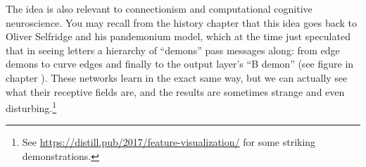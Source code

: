 The idea is also relevant to connectionism and computational cognitive neuroscience. You may recall from the history chapter that this idea goes  back to Oliver Selfridge and his pandemonium model, which at the time just speculated that in seeing letters a hierarchy of ``demons'' pass messages along: from edge demons to curve edges and finally to the output layer's ``B demon'' (see figure  in chapter ). These networks learn in the exact same way, but we can actually  see what their receptive fields are, and the results are sometimes strange and even disturbing.\footnote{See \url{https://distill.pub/2017/feature-visualization/} for some striking demonstrations.} 
